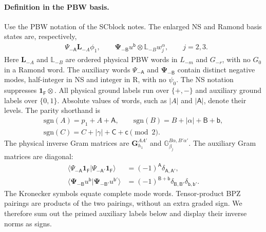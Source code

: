 \documentclass[11pt]{article}
\numberwithin{equation}{section}
\begin{document}
\paragraph{Definition in the PBW basis.}
Use the PBW notation of the SCblock notes. The enlarged NS and Ramond
basis states are, respectively,
\begin{align}
 &\Psi_{-\mathsf A}\mathbf L_{-A}\phi_1,\qquad
 \boldsymbol\Psi_{-\mathsf B}u^{\mathsf b}
              \otimes\mathbb L_{-B}w_j^\alpha,
 \qquad j=2,3.
 \label{eq:inserted-pbw-bases}
\end{align}
Here $\mathbf L_{-A}$ and $\mathbb L_{-B}$ are ordered physical PBW
words in $L_{-m}$ and $G_{-r}$, with no $G_0$ in a Ramond word.
The auxiliary words $\Psi_{-\mathsf A}$ and
$\boldsymbol\Psi_{-\mathsf B}$ contain distinct negative modes,
half-integer in NS and integer in R, with no $\psi_0$.
The NS notation suppresses $\mathbf1_{\mathsf F}\otimes$.
All physical ground labels run over $\{+,-\}$ and auxiliary ground
labels over $\{0,1\}$. Absolute values of words, such as $|A|$ and
$|\mathsf A|$, denote their levels. The parity shorthand is
\begin{gather}
 \mathrm{sgn}(A)=p_1+A+\mathsf A,\qquad
 \mathrm{sgn}(B)=B+|\alpha|+\mathsf B+\mathsf b,\nonumber\\
 \mathrm{sgn}(C)=C+|\gamma|+\mathsf C+\mathsf c
 \pmod2.
 \label{eq:inserted-pbw-grading}
\end{gather}
The physical inverse Gram matrices are
$\mathbf G_{h_1}^{AA'}$ and
$\mathbb G_{\beta_j}^{B\alpha,B'\alpha'}$.
The auxiliary Gram matrices are diagonal:
\begin{align}
 \langle\Psi_{-\mathsf A}\mathbf1_{\mathsf F}
   |\Psi_{-\mathsf A'}\mathbf1_{\mathsf F}\rangle
 &=(-1)^{\mathsf A}\delta_{\mathsf A,\mathsf A'},\nonumber\\
 \langle\boldsymbol\Psi_{-\mathsf B}u^{\mathsf b}
   |\boldsymbol\Psi_{-\mathsf B'}u^{\mathsf b'}\rangle
 &=(-1)^{\mathsf B+\mathsf b}
       \delta_{\mathsf B,\mathsf B'}\delta_{\mathsf b,\mathsf b'}.
 \label{eq:inserted-pbw-grams}
\end{align}
The Kronecker symbols equate complete mode words. Tensor-product BPZ
pairings are products of the two pairings, without an extra graded sign.
We therefore sum out the primed auxiliary labels below and display their
inverse norms as signs.
\end{document}
